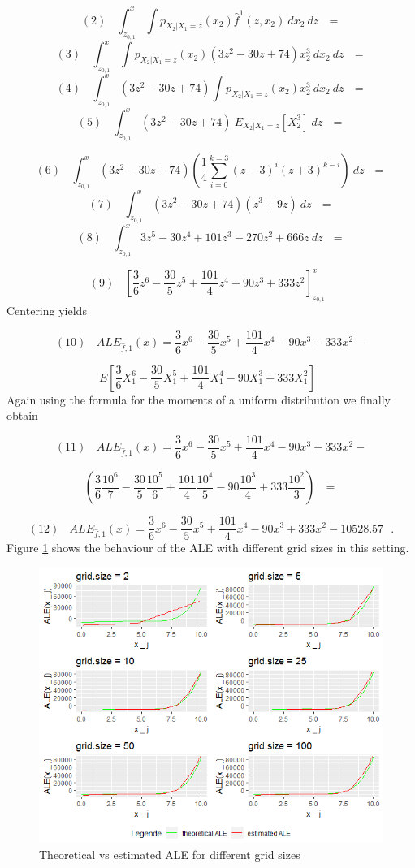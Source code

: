 \documentclass[
]{krantz}
\begin{document}
\[(2)~~~~ \int_{z_{0,1}}^x \int p_{X_2\vert X_1=z}(x_2)\hat{f}^1(z,x_2)~dx_2~dz~~~=\]
\[(3)~~~~ \int_{z_{0,1}}^x \int p_{X_2\vert X_1=z}(x_2)(3z^2 -30z +74)x_2^3~dx_2~dz~~~=\]
\[(4)~~~~ \int_{z_{0,1}}^x (3z^2 -30z +74)\int p_{X_2\vert X_1=z}(x_2)x_2^3~dx_2~dz~~~=\]
\[(5)~~~~ \int_{z_{0,1}}^x (3z^2 -30z +74)~E_{X_2\vert X_1 = z}[X_2^3]~dz~~~=\]

\[(6)~~~~ \int_{z_{0,1}}^x (3z^2 -30z +74)(\frac{1}{4}\sum_{i=0}^{k=3}(z-3)^i(z+3)^{k-i})~dz~~~=\]
\[(7)~~~~ \int_{z_{0,1}}^x (3z^2 -30z +74)(z^3 + 9z)~dz~~~=\]
\[(8)~~~~ \int_{z_{0,1}}^x 3 z^5 - 30 z^4 + 101 z^3 - 270 z^2 + 666 z ~dz~~~=\]

\[(9)~~~~ [ \frac{3}{6} z^6 - \frac{30}{5}z^5 + \frac{101}{4}z^4 - 90 z^3 + 333 z^2]_{z_{0,1}}^x~~~\]
Centering yields

\[(10)~~~~ALE_{\hat{f},1}(x) =  \frac{3}{6} x^6 - \frac{30}{5}x^5 + \frac{101}{4}x^4 - 90 x^3 + 333 x^2 - \]

\[E[ \frac{3}{6} X_1^6 - \frac{30}{5}X_1^5 + \frac{101}{4}X_1^4 - 90 X_1^3 + 333 X_1^2] ~~~\]
Again using the formula for the moments of a uniform distribution we finally obtain

\[(11)~~~~ALE_{\hat{f},1}(x) =  \frac{3}{6} x^6 - \frac{30}{5}x^5 + \frac{101}{4}x^4 - 90 x^3 + 333 x^2 - \]

\[(\frac{3}{6}\frac{10^6}{7}-\frac{30}{5}\frac{10^5}{6} +\frac{101}{4}\frac{10^4}{5}-90\frac{10^3}{4}+333\frac{10^2}{3}) ~~~=\]

\[(12)~~~~ALE_{\hat{f},1}(x) =  \frac{3}{6} x^6 - \frac{30}{5}x^5 + \frac{101}{4}x^4 - 90 x^3 + 333 x^2 - 10528.57~~~.\]
Figure \ref{fig:exampleALE2} shows the behaviour of the ALE with different grid sizes in this setting.

\begin{figure}
\includegraphics[width=1\linewidth]{images/ALE_2_example2_6plots_} \caption{Theoretical vs estimated ALE for different grid sizes}\label{fig:exampleALE2}
\end{figure}
\end{document}
